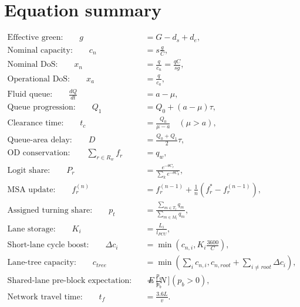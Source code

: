 \chapter{Equation summary}
\label{app:equations}

\begin{align}
\text{Effective green:}\qquad
 g &= G-d_s+d_e,\\[4pt]
\text{Nominal capacity:}\qquad
 c_n &= s\frac{g}{C},\\[4pt]
\text{Nominal DoS:}\qquad
 x_n &= \frac{q}{c_n}=\frac{qC}{sg},\\[4pt]
\text{Operational DoS:}\qquad
 x_a &= \frac{q}{c_a},\\[4pt]
\text{Fluid queue:}\qquad
 \frac{dQ}{dt} &= a-\mu,\\[4pt]
\text{Queue progression:}\qquad
 Q_1 &= Q_0+(a-\mu)\tau,\\[4pt]
\text{Clearance time:}\qquad
 t_c &= \frac{Q_0}{\mu-a}\quad(\mu>a),\\[4pt]
\text{Queue-area delay:}\qquad
 D &= \frac{Q_0+Q_1}{2}\tau,\\[4pt]
\text{OD conservation:}\qquad
 \sum_{r\in R_w} f_r &= q_w,\\[4pt]
\text{Logit share:}\qquad
 P_r &= \frac{e^{-\theta C_r}}{\sum_k e^{-\theta C_k}},\\[4pt]
\text{MSA update:}\qquad
 f_r^{(n)} &= f_r^{(n-1)}+\frac{1}{n}\left(f_r^*-f_r^{(n-1)}\right),\\[4pt]
\text{Assigned turning share:}\qquad
 p_t &= \frac{\sum_{m\in T_l}q_m}{\sum_{m\in M_l}q_m},\\[4pt]
\text{Lane storage:}\qquad
 K_i &= \frac{L_i}{l_{PCU}},\\[4pt]
\text{Short-lane cycle boost:}\qquad
 \Delta c_i &= \min\left(c_{n,i},K_i\frac{3600}{C}\right),\\[4pt]
\text{Lane-tree capacity:}\qquad
 c_{tree} &= \min\left(\sum_i c_{n,i}, c_{n,root}+\sum_{i\ne root}\Delta c_i\right),\\[4pt]
\text{Shared-lane pre-block expectation:}\qquad
 E[N] &= \frac{p_g}{p_b}\quad(p_b>0),\\[4pt]
\text{Network travel time:}\qquad
 t_f &= \frac{3.6L}{v}.
\end{align}
